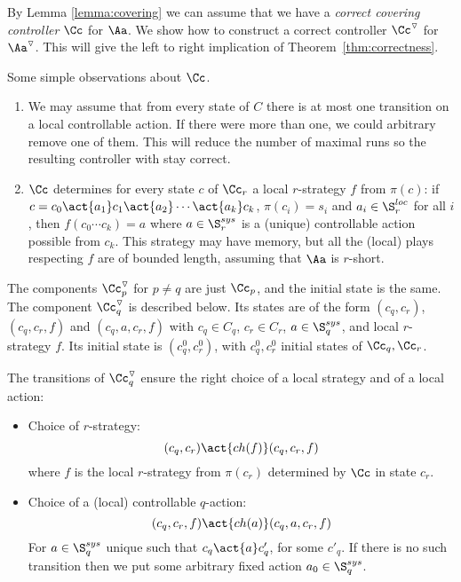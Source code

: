 \documentclass[10pt,a4paper]{article}
\newcommand{\red}[1]{#1^\triangledown}
\newcommand{\Sloc}{\S^{loc}}
\newcommand{\Ssys}{\S^{sys}}
\newcommand{\ch}{\mathop{ch}}
\begin{document}
By Lemma \ref{lemma:covering} we can assume that we have a
\emph{correct covering controller}  $\Cc$ for $\Aa$. We show how to construct
a correct controller $\red\Cc$ for $\red\Aa$. This will give the left
to right implication of Theorem~\ref{thm:correctness}.

\begin{remark} Some simple observations about $\Cc$.
\begin{enumerate}
\item We may assume that from every state of $C$ there is at most one
  transition on a local controllable action. If there were more than
  one, we could arbitrary remove one of them. This will reduce
  the number of maximal runs so the resulting controller with stay correct.

\item $\Cc$ determines for every state $c$ of $\Cc_r$ a local
  $r$-strategy $f$ from $\pi(c)$: if $c=c_0 \act{a_1} c_1 \act{a_2}
  \cdots \act{a_k} c_k$, $\pi(c_i)=s_i$ and $a_i \in \Sloc_r$ for all
  $i$, then $f(c_0 \cdots c_k)=a$ where $a\in\Ssys_r$ is a (unique)
  controllable action possible from $c_k$. This strategy
  may have memory, but all the (local) plays respecting
  $f$ are of bounded length, assuming that $\Aa$ is $r$-short.
\end{enumerate}
\end{remark}


The components $\red\Cc_p$ for $p\not=q$ are just $\Cc_p$, and the
initial state is the same. The
component $\red\Cc_q$ is described below. Its states are of the form
$(c_q,c_r)$, $(c_q,c_r,f)$ and $(c_q,a,c_r,f)$ with $c_q \in C_q$,
$c_r \in C_r$, $a \in \Ssys_q$, and local $r$-strategy $f$. Its
initial state is $(c^0_q,c^0_r)$, with $c^0_q,c^0_r$ initial
states of $\Cc_q,\Cc_r$. 

The transitions of $\red\Cc_q$ ensure the right choice of a local
strategy and of a local action:

\begin{itemize}
\item Choice of $r$-strategy:
  \[ (c_q,c_r)\act{\ch(f)}(c_q,c_r,f)\] where $f$ is the local
  $r$-strategy from $\pi(c_r)$ determined by $\Cc$ in state $c_r$.

\item Choice of a (local) controllable $q$-action:
  \[(c_q,c_r,f)\act{\ch(a)} (c_q,a,c_r,f)\] For $a \in \Ssys_q$ unique such that
  $c_q\act{a}c_q'$, for some $c'_q$. If there is no such transition then we
  put some arbitrary fixed action $a_0\in \Ssys_q$.
\end{itemize}
\end{document}
